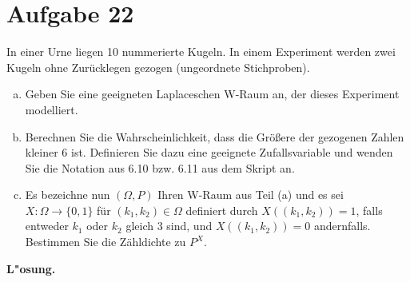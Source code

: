 \documentclass[10pt, oneside]{article}
\begin{document}
\section{Aufgabe 22}
In einer Urne liegen 10 nummerierte Kugeln. In einem Experiment werden zwei
Kugeln ohne Zurücklegen gezogen (ungeordnete Stichproben).
\begin{enumerate}[(a)]
    \item Geben Sie eine geeigneten Laplaceschen W-Raum an, der dieses
        Experiment modelliert.
    \item Berechnen Sie die Wahrscheinlichkeit, dass die Größere der gezogenen
        Zahlen kleiner 6 ist. Definieren Sie dazu eine geeignete
        Zufallsvariable und wenden Sie die Notation aus 6.10 bzw. 6.11 aus dem
        Skript an.
    \item Es bezeichne nun $(\Omega,P)$ Ihren W-Raum aus Teil (a) und es sei
        $X:\Omega\to\{0,1\}$ für $(k_1,k_2)\in\Omega$ definiert durch
        $X((k_1,k_2))=1$, falls entweder $k_1$ oder $k_2$ gleich 3 sind, und
        $X((k_1,k_2))=0$ andernfalls. Bestimmen Sie die Zähldichte zu $P^X.$
\end{enumerate}
\textbf{L"osung.}
\end{document}
